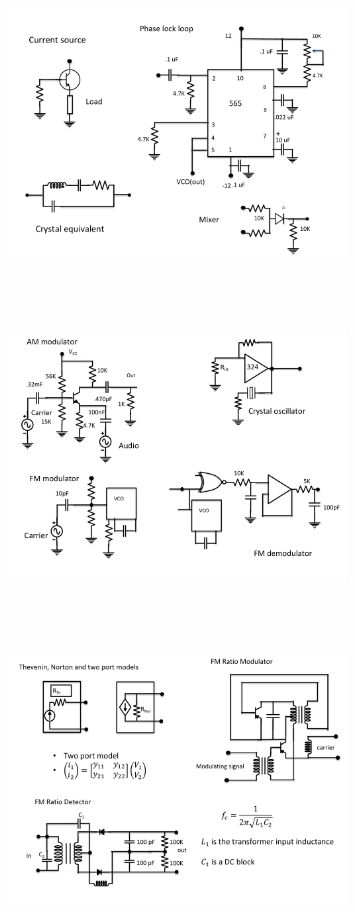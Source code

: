 \begin{figure} 
\center
\includegraphics[width=0.8\textwidth,natwidth=642,natheight=610, height=80mm, width=88mm]{circuit14.pdf}
\end{figure}
\begin{figure} 
\center
\includegraphics[width=0.8\textwidth,natwidth=642,natheight=610, height=80mm, width=88mm]{circuit15.pdf}
\end{figure}
\begin{figure} 
\center
\includegraphics[width=0.8\textwidth,natwidth=642,natheight=610, height=80mm, width=88mm]{circuit16.pdf}
\end{figure}
